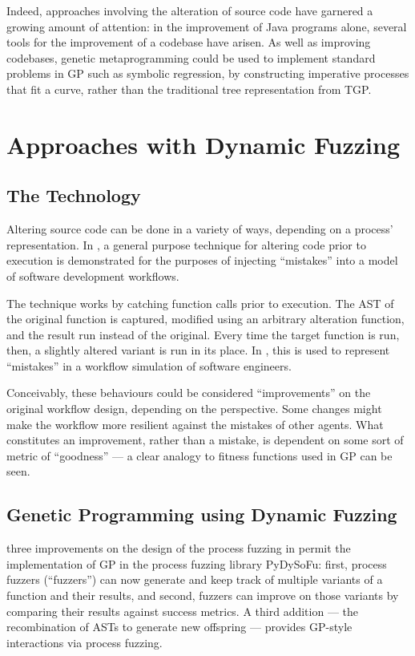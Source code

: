 \documentclass[draft,12pt]{llncs}   %
\begin{document}
Indeed, approaches involving the alteration of source code have garnered a
growing amount of attention: in the improvement of Java programs alone, several
tools for the improvement of a codebase have
arisen\cite{cody2015locogp,arcuri2008multi,orlov2011flight,castle2012evolving}.
As well as improving codebases, genetic metaprogramming could be used to
implement standard problems in GP such as symbolic regression, by constructing
imperative processes that fit a curve, rather than the traditional tree
representation from TGP\cite{koza1994genetic}.
\par


\section{Approaches with Dynamic Fuzzing}
\label{sec:dynamic_fuzzing}
\subsection{The Technology}
Altering source code can be done in a variety of ways, depending on a process'
representation. In \cite{wallis2018a}, a general purpose technique for altering
code prior to execution is demonstrated for the purposes of injecting
``mistakes'' into a model of software development workflows.\par

The technique works by catching function calls prior to execution. The AST of
the original function is captured, modified using an arbitrary alteration
function, and the result run instead of the original. Every time the target
function is run, then, a slightly altered variant is run in its place. In
\cite{wallis2018a}, this is used to represent ``mistakes'' in a workflow
simulation of software engineers.\par

Conceivably, these behaviours could be considered ``improvements'' on the
original workflow design, depending on the perspective. Some changes might make
the workflow more resilient against the mistakes of other agents. What
constitutes an improvement, rather than a mistake, is dependent on some sort of
metric of ``goodness'' --- a clear analogy to fitness functions used in GP can be
seen.\par

\subsection{Genetic Programming using Dynamic Fuzzing}
three improvements on the design of the process fuzzing in \cite{wallis2018a}
permit the implementation of GP in the process fuzzing library
PyDySoFu\cite{pydysofu}: first, process fuzzers (``fuzzers'') can now generate
and keep track of multiple variants of a function and their results, and second,
fuzzers can improve on those variants by comparing their results against success
metrics. A third addition --- the recombination of ASTs to generate new
offspring --- provides GP-style interactions via process fuzzing.\par
\end{document}

